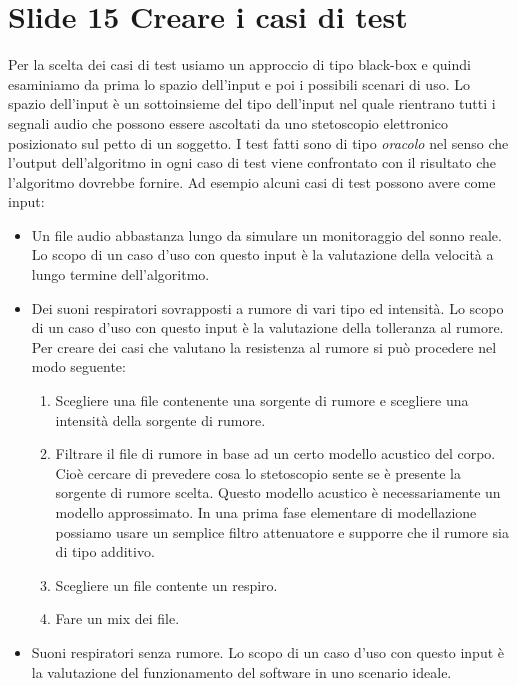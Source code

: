 \section{Slide 15 Creare i casi di test}

Per la scelta dei casi di test usiamo un approccio di tipo black-box e quindi esaminiamo da prima lo spazio dell'input e poi i possibili scenari di uso. 
Lo spazio dell'input \`e un sottoinsieme del tipo dell'input nel quale rientrano tutti i segnali audio che possono essere ascoltati da uno stetoscopio elettronico posizionato sul petto di un soggetto.
I test fatti sono di tipo \emph{oracolo} nel senso che l'output dell'algoritmo in ogni caso di test viene confrontato con il risultato che l'algoritmo dovrebbe fornire. 
Ad esempio alcuni casi di test possono avere come input:
\begin{itemize}
  \item
    Un file audio abbastanza lungo da simulare un monitoraggio del sonno reale. 
    Lo scopo di un caso d'uso con questo input \`e la valutazione della velocit\`a a lungo termine dell'algoritmo.
  \item
    Dei suoni respiratori sovrapposti a rumore di vari tipo ed intensit\`a. 
    Lo scopo di un caso d'uso con questo input \`e la valutazione della tolleranza al rumore.
    Per creare dei casi che valutano la resistenza al rumore si pu\`o procedere nel modo seguente:
    \begin{enumerate}
      \item 
	Scegliere una file contenente una sorgente di rumore e scegliere una intensit\`a della sorgente di rumore.
      \item
	Filtrare il file di rumore in base ad un certo modello acustico del corpo. 
	Cio\`e cercare di prevedere cosa lo stetoscopio sente se \`e presente la sorgente di rumore scelta. 
	Questo modello acustico \`e necessariamente un modello approssimato. 
	In una prima fase elementare di modellazione possiamo usare un semplice filtro attenuatore e supporre che il rumore sia di tipo additivo.
      \item
	Scegliere un file contente un respiro.
      \item
	Fare un mix dei file.
    \end{enumerate}
  \item
    Suoni respiratori senza rumore. 
    Lo scopo di un caso d'uso con questo input \`e la valutazione del funzionamento del software in uno scenario ideale.

\end{itemize}
